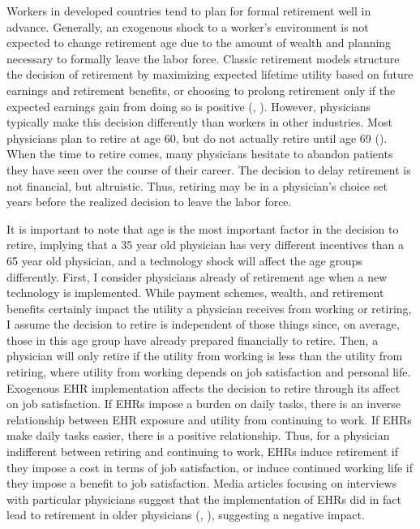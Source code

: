 \documentclass[12pt]{article}
\begin{document}
Workers in developed countries tend to plan for formal retirement well in advance. Generally, an exogenous shock to a worker's environment is not expected to change retirement age due to the amount of wealth and planning necessary to formally leave the labor force. Classic retirement models structure the decision of retirement by maximizing expected lifetime utility based on future earnings and retirement benefits, or choosing to prolong retirement only if the expected earnings gain from doing so is positive (\cite{gustman1986disaggregated}, \cite{stock1990pension}). However, physicians typically make this decision differently than workers in other industries. Most physicians plan to retire at age 60, but do not actually retire until age 69 (\cite{collier2017challenges}). When the time to retire comes, many physicians hesitate to abandon patients they have seen over the course of their career. The decision to delay retirement is not financial, but altruistic. Thus, retiring may be in a physician's choice set years before the realized decision to leave the labor force. 

It is important to note that age is the most important factor in the decision to retire, implying that a 35 year old physician has very different incentives than a 65 year old physician, and a technology shock will affect the age groups differently. First, I consider physicians already of retirement age when a new technology is implemented. While payment schemes, wealth, and retirement benefits certainly impact the utility a physician receives from working or retiring, I assume the decision to retire is independent of those things since, on average, those in this age group have already prepared financially to retire. Then, a physician will only retire if the utility from working is less than the utility from retiring, where utility from working depends on job satisfaction and personal life. Exogenous EHR implementation affects the decision to retire through its affect on job satisfaction. If EHRs impose a burden on daily tasks, there is an inverse relationship between EHR exposure and utility from continuing to work. If EHRs make daily tasks easier, there is a positive relationship. Thus, for a physician indifferent between retiring and continuing to work, EHRs induce retirement if they impose a cost in terms of job satisfaction, or induce continued working life if they impose a benefit to job satisfaction. Media articles focusing on interviews with particular physicians suggest that the implementation of EHRs did in fact lead to retirement in older physicians (\cite{ringel_2019}, \cite{loria_2020}), suggesting a negative impact. 
\end{document}
